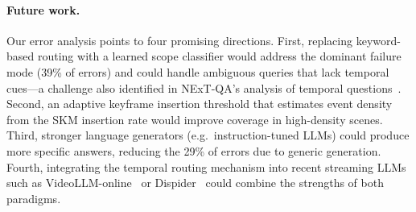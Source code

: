 \paragraph{Future work.}
Our error analysis points to four promising directions.
First, replacing keyword-based routing with a learned scope classifier would address the dominant failure mode (39\% of errors) and could handle ambiguous queries that lack temporal cues---a challenge also identified in NExT-QA's analysis of temporal questions~\cite{xiao2021nextqa}.
Second, an adaptive keyframe insertion threshold that estimates event density from the SKM insertion rate would improve coverage in high-density scenes.
Third, stronger language generators (e.g.\ instruction-tuned LLMs) could produce more specific answers, reducing the 29\% of errors due to generic generation.
Fourth, integrating the temporal routing mechanism into recent streaming LLMs such as VideoLLM-online~\cite{chen2024videollmonline} or Dispider~\cite{he2024dispider} could combine the strengths of both paradigms.
